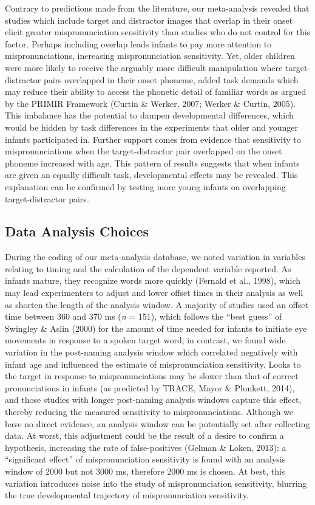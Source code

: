 \documentclass[
  man, noextraspace]{apa6}
\begin{document}
Contrary to predictions made from the literature, our meta-analysis revealed that studies which include target and distractor images that overlap in their onset elicit greater mispronunciation sensitivity than studies who do not control for this factor. Perhaps including overlap leads infants to pay more attention to mispronunciations, increasing mispronunciation sensitivity. Yet, older children were more likely to receive the arguably more difficult manipulation where target-distractor pairs overlapped in their onset phoneme, added task demands which may reduce their ability to access the phonetic detail of familiar words as argued by the PRIMIR Framework (Curtin \& Werker, 2007; Werker \& Curtin, 2005). This imbalance has the potential to dampen developmental differences, which would be hidden by task differences in the experiments that older and younger infants participated in. Further support comes from evidence that sensitivity to mispronunciations when the target-distractor pair overlapped on the onset phoneme increased with age. This pattern of results suggests that when infants are given an equally difficult task, developmental effects may be revealed. This explanation can be confirmed by testing more young infants on overlapping target-distractor pairs.

\hypertarget{data-analysis-choices}{%
\subsection{Data Analysis Choices}\label{data-analysis-choices}}

During the coding of our meta-analysis database, we noted variation in variables relating to timing and the calculation of the dependent variable reported. As infants mature, they recognize words more quickly (Fernald et al., 1998), which may lead experimenters to adjust and lower offset times in their analysis as well as shorten the length of the analysis window. A majority of studies used an offset time between 360 and 370 ms (\emph{n} = 151), which follows the \enquote{best guess} of Swingley \& Aslin (2000) for the amount of time needed for infants to initiate eye movements in response to a spoken target word; in contrast, we found wide variation in the post-naming analysis window which correlated negatively with infant age and influenced the estimate of mispronunciation sensitivity. Looks to the target in response to mispronunciations may be slower than that of correct pronunciations in infants (as predicted by TRACE, Mayor \& Plunkett, 2014), and those studies with longer post-naming analysis windows capture this effect, thereby reducing the measured sensitivity to mispronunciations. Although we have no direct evidence, an analysis window can be potentially set after collecting data. At worst, this adjustment could be the result of a desire to confirm a hypothesis, increasing the rate of false-positives (Gelman \& Loken, 2013): a \enquote{significant effect} of mispronunciation sensitivity is found with an analysis window of 2000 but not 3000 ms, therefore 2000 ms is chosen. At best, this variation introduces noise into the study of mispronunciation sensitivity, blurring the true developmental trajectory of mispronunciation sensitivity.
\end{document}
